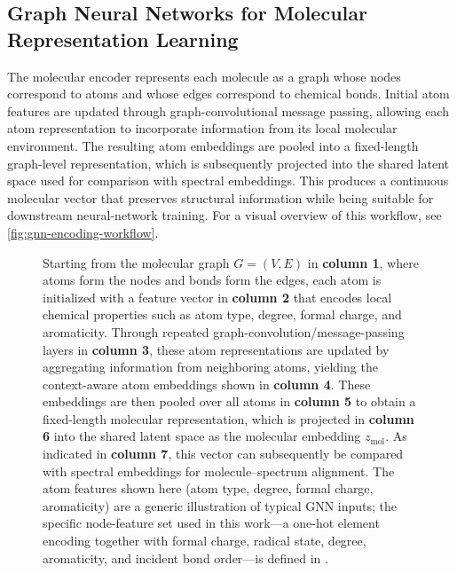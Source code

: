 \subsection{Graph Neural Networks for Molecular Representation Learning}
The molecular encoder represents each molecule as a graph whose nodes correspond to atoms and whose edges correspond to chemical bonds.
Initial atom features are updated through graph-convolutional message passing, allowing each atom representation to incorporate information from its local molecular environment.
The resulting atom embeddings are pooled into a fixed-length graph-level representation, which is subsequently projected into the shared latent space used for comparison with spectral embeddings.
This produces a continuous molecular vector that preserves structural information while being suitable for downstream neural-network training.
For a visual overview of this workflow, see \autoref{fig:gnn-encoding-workflow}.


\begin{figure}[ht]
    \centering
    \resizebox{0.9\textwidth}{!}{%
    }
    \caption[Graph-convolutional molecular encoding workflow]{
        Starting from the molecular graph $G=(V,E)$ in \textbf{column 1}, where atoms form the nodes and bonds form the edges, each atom is initialized with a feature vector in \textbf{column 2} that encodes local chemical properties such as atom type, degree, formal charge, and aromaticity.
        Through repeated graph-convolution/message-passing layers in \textbf{column 3}, these atom representations are updated by aggregating information from neighboring atoms, yielding the context-aware atom embeddings shown in \textbf{column 4}.
        These embeddings are then pooled over all atoms in \textbf{column 5} to obtain a fixed-length molecular representation, which is projected in \textbf{column 6} into the shared latent space as the molecular embedding $z_{\mathrm{mol}}$.
        As indicated in \textbf{column 7}, this vector can subsequently be compared with spectral embeddings for molecule--spectrum alignment.
        The atom features shown here (atom type, degree, formal charge, aromaticity) are a generic illustration of typical GNN inputs; the specific node-feature set used in this work---a one-hot element encoding together with formal charge, radical state, degree, aromaticity, and incident bond order---is defined in .
    }
    \label{fig:gnn-encoding-workflow}
\end{figure}
